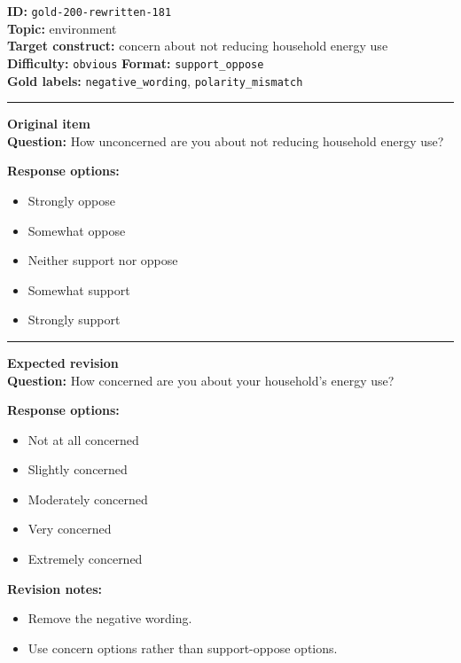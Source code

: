 \documentclass[10pt,a4paper]{article}
\newcommand{\sectionline}{\vspace{0.15em}\hrule\vspace{0.35em}}
\begin{document}
\begin{tcolorbox}[colframe=FlawRed,colback=white,colbacktitle=FlawRed!9,coltitle=black,title={Item 181\hfill Flawed item}]
\textbf{ID:} \texttt{gold-200-rewritten-181}\\
\textbf{Topic:} environment\\
\textbf{Target construct:} concern about not reducing household energy use\\
\textbf{Difficulty:} \texttt{obvious} \quad \textbf{Format:} \texttt{support\_oppose}\\
\textbf{Gold labels:} \texttt{negative\_wording}, \texttt{polarity\_mismatch}\\
\sectionline
\textbf{Original item}\\
\textbf{Question:} How unconcerned are you about not reducing household energy use?
\par\textbf{Response options:}
\begin{itemize}
\item Strongly oppose
\item Somewhat oppose
\item Neither support nor oppose
\item Somewhat support
\item Strongly support
\end{itemize}
\sectionline
\textbf{Expected revision}\\
\textbf{Question:} How concerned are you about your household's energy use?
\par\textbf{Response options:}
\begin{itemize}
\item Not at all concerned
\item Slightly concerned
\item Moderately concerned
\item Very concerned
\item Extremely concerned
\end{itemize}
\par\textbf{Revision notes:}
\begin{itemize}
\item Remove the negative wording.
\item Use concern options rather than support-oppose options.
\end{itemize}
\end{tcolorbox}
\end{document}
